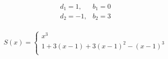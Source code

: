 \documentclass[12pt]{article}
\begin{document}
\[
\begin{array}{cc}
  d_1 = 1, & b_1 =  0\\
  d_2 = -1, & b_2 = 3\\
\end{array}
\]

\begin{displaymath}
  S(x) = \left\{
  \begin{array}{c}
    x^3\\
    1 + 3(x-1) + 3(x-1)^2  - (x-1)^3\\
    \end{array}
  \right.
\end{displaymath}
\end{document}
